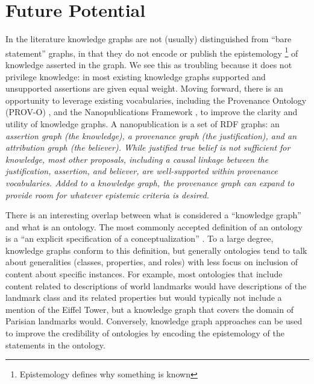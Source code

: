 \section{Future Potential}

In the literature knowledge graphs are not (usually) distinguished from ``bare statement'' graphs, in that they do not encode or publish the epistemology \footnote{Epistemology defines why something is known} of knowledge asserted in the graph.
We see this as troubling because it does not privilege knowledge: in most existing knowledge graphs supported and unsupported assertions are given equal weight.
Moving forward, there is an opportunity to leverage existing vocabularies, including the Provenance Ontology (PROV-O) \cite{Moreau_2015}, and the Nanopublications Framework \cite{groth2010anatomy}, to improve the clarity and utility of knowledge graphs.
A nanopublication is a set of RDF graphs: an \em{assertion graph} (the knowledge), a \em{provenance graph} (the justification), and an \em{attribution graph} (the believer).
While justified true belief is not sufficient for knowledge, most other proposals, including a causal linkage between the justification, assertion, and believer, are well-supported within provenance vocabularies.
Added to a knowledge graph, the provenance graph can expand to provide room for whatever epistemic criteria is desired.

There is an interesting overlap between what is considered a ``knowledge graph'' and what is an ontology.
The most commonly accepted definition of an ontology is a ``an explicit specification of a conceptualization'' \cite{Gruber_1993}.
To a large degree, knowledge graphs conform to this definition, but generally ontologies tend to talk about generalities (classes, properties, and roles) with less focus on inclusion of content about specific instances.
For example, most ontologies that include content related to descriptions of world landmarks would have descriptions of the landmark class and its related properties but would typically not include a mention of the Eiffel Tower, but a knowledge graph that covers the domain of Parisian landmarks would.
Conversely, knowledge graph approaches can be used to improve the credibility of ontologies by encoding the epistemology of the statements in the ontology.
